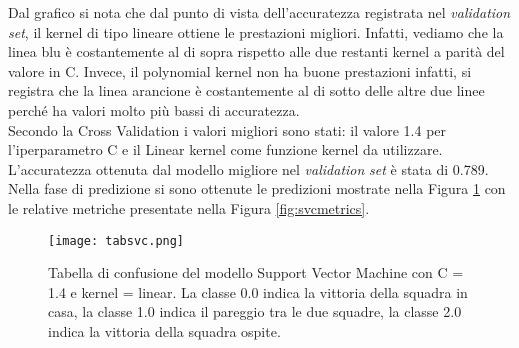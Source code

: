 Dal grafico si nota che dal punto di vista dell'accuratezza registrata nel \emph{validation} \emph{set}, il kernel di tipo lineare ottiene le prestazioni migliori. Infatti, vediamo che la linea blu è costantemente al di sopra rispetto alle due restanti kernel a parità del valore in C. Invece, il polynomial kernel non ha buone prestazioni infatti, si registra che la linea arancione è costantemente al di sotto delle altre due linee perché ha valori molto più bassi di accuratezza.\\
Secondo la Cross Validation i valori migliori sono stati: il valore 1.4 per l'iperparametro \textsf{C} e il Linear kernel come funzione \textsf{kernel} da utilizzare.
L'accuratezza ottenuta dal modello migliore nel \emph{validation} \emph{set} è stata di 0.789.\\ Nella fase di predizione si sono ottenute le predizioni mostrate nella Figura \ref{fig:tabsvc} con le relative metriche presentate nella Figura \ref{fig:svcmetrics}.
\begin{figure}[]
	\begin{center}
		\texttt{[image: tabsvc.png]}
		\caption{Tabella di confusione del modello Support Vector Machine con \textsf{C} = 1.4 e \textsf{kernel} = linear. La classe 0.0 indica la vittoria della squadra in casa, la classe 1.0 indica il pareggio tra le due squadre, la classe 2.0 indica la vittoria della squadra ospite.
		} 
		\label{fig:tabsvc}
	\end{center}
\end{figure}

